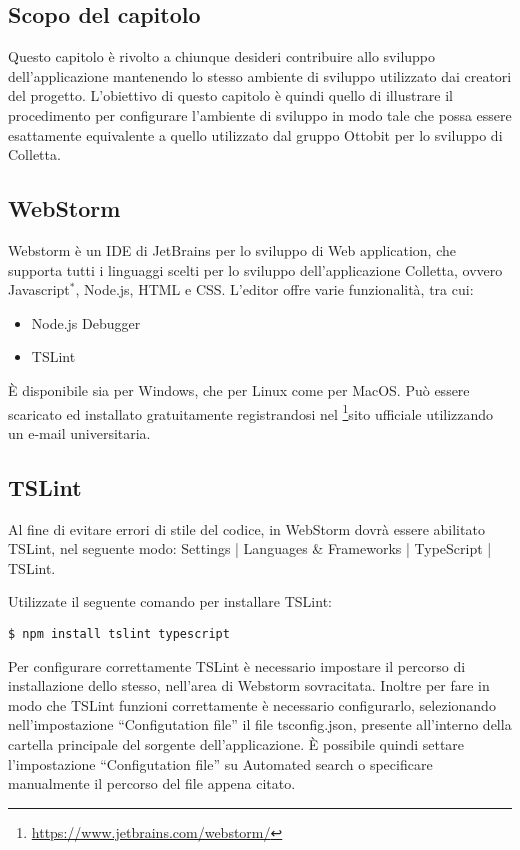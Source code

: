 \subsection{Scopo del capitolo}
Questo capitolo è rivolto a chiunque desideri contribuire allo sviluppo dell'applicazione mantenendo lo stesso ambiente di sviluppo utilizzato dai creatori del progetto.
L'obiettivo di questo capitolo è quindi quello di illustrare il procedimento per configurare l'ambiente di sviluppo in modo tale che possa essere esattamente equivalente a quello utilizzato dal gruppo Ottobit per lo sviluppo di Colletta.

\subsection{WebStorm}
Webstorm è un IDE di JetBrains per lo sviluppo di Web application, che supporta tutti i linguaggi scelti per lo sviluppo dell'applicazione Colletta, ovvero Javascript$^*$, Node.js, HTML e CSS.
L'editor offre varie funzionalità, tra cui:
\begin{itemize}
	\item Node.js Debugger
	\item TSLint
\end{itemize}
È disponibile sia per Windows, che per Linux come per MacOS.
Può essere scaricato ed installato gratuitamente registrandosi nel \footnote{\url{https://www.jetbrains.com/webstorm/}}sito ufficiale utilizzando un e-mail universitaria.

\subsection{TSLint}
Al fine di evitare errori di stile del codice, in WebStorm dovrà essere abilitato TSLint, nel seguente modo: Settings | Languages \& Frameworks | TypeScript | TSLint.

Utilizzate il seguente comando per installare TSLint:
\begin{center}
		\begin{minipage}{0.5\textwidth}
			\begin{lstlisting}[caption=Installazione per l'analisi statica,numbers=none]			
		$ npm install tslint typescript
			\end{lstlisting}
		\end{minipage}
\end{center}
Per configurare correttamente TSLint è necessario impostare il percorso di installazione dello stesso, nell'area di Webstorm sovracitata.
Inoltre per fare in modo che TSLint funzioni correttamente è necessario configurarlo, selezionando nell'impostazione ``Configutation file'' il file tsconfig.json, presente all'interno della cartella principale del sorgente dell'applicazione. È possibile quindi settare l'impostazione ``Configutation file'' su Automated search o specificare manualmente il percorso del file appena citato.

